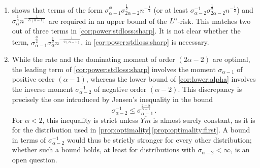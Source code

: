 \documentclass{article}
\newcommand{\eqfs}{\,.}
\newcommand{\ol}[2]{\overline{#1#2}}
\begin{document}
%
\begin{remark}
    \begin{enumerate}[label=(\roman*)]
        \item
         shows that terms of the form $\sigma_{\alpha-1}^{\phi} \sigma_{2\alpha-2}^{\frac12} n^{-\frac12}$ (or at least $\sigma_{\alpha-2}^{-1} \sigma_{2\alpha-2}^{\frac12} n^{-\frac12}$) and $\sigma_\alpha^{\frac1\alpha} n^{-\frac{1}{\alpha(\alpha-1)}}$ are required in an upper bound of the $L^\alpha$-risk. This matches two out of three terms in \cref{cor:power:stdloss:sharp}. It is not clear whether the term, $\sigma_{\alpha-1}^{\frac\phi2} \sigma_{\alpha}^{\frac12} n^{-\frac{1}{2(\alpha-1)}}$, in \cref{cor:power:stdloss:sharp} is necessary.
        \item 
        While the rate and the dominating moment of order $(2\alpha-2)$ are optimal, the leading term of \cref{cor:power:stdloss:sharp} involves the moment $\sigma_{\alpha-1}$ of positive order $(\alpha-1)$, whereas the lower bound of \cref{cor:lower:alpha} involves the inverse moment $\sigma_{\alpha-2}^{-1}$ of negative order $(\alpha-2)$. This discrepancy is precisely the one introduced by Jensen's inequality in the bound
        \begin{equation}
            \sigma_{\alpha-2}^{-1}
            \leq
            \sigma_{\alpha-1}^{\frac{2-\alpha}{\alpha-1}}
            \eqfs
        \end{equation}
        For $\alpha<2$, this inequality is strict unless $\ol Ym$ is almost surely constant, as it is for the distribution used in \cref{prop:optimality}\,\ref{prop:optimality:first}. A bound in terms of $\sigma_{\alpha-2}^{-1}$ would thus be strictly stronger for every other distribution; whether such a bound holds, at least for distributions with $\sigma_{\alpha-2}<\infty$, is an open question.
    \end{enumerate}
\end{remark}
\end{document}
